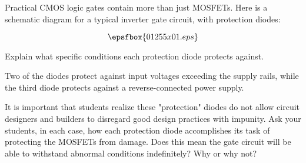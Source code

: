 

Practical CMOS logic gates contain more than just MOSFETs.  Here is a schematic diagram for a typical inverter gate circuit, with protection diodes:

$$\epsfbox{01255x01.eps}$$

Explain what specific conditions each protection diode protects against.







Two of the diodes protect against input voltages exceeding the supply rails, while the third diode protects against a reverse-connected power supply.







It is important that students realize these "protection" diodes do not allow circuit designers and builders to disregard good design practices with impunity.  Ask your students, in each case, how each protection diode accomplishes its task of protecting the MOSFETs from damage.  Does this mean the gate circuit will be able to withstand abnormal conditions indefinitely?  Why or why not?




